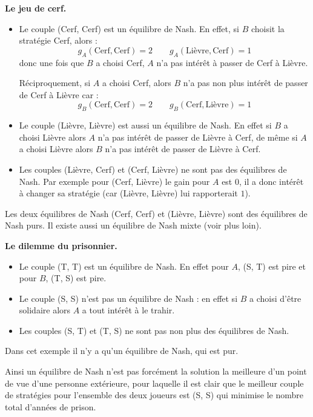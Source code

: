 \documentclass[11pt,class=report,crop=false]{standalone}
\begin{document}
\textbf{Le jeu de cerf.}




\begin{itemize}
	\item Le couple (Cerf, Cerf) est un équilibre de Nash.
	En effet, si $B$ choisit la stratégie Cerf, alors :
	$$g_A(\text{Cerf}, \text{Cerf}) = 2 \qquad g_A(\text{Lièvre}, \text{Cerf}) = 1$$
	donc une fois que $B$ a choisi Cerf, $A$ n'a pas intérêt à passer de Cerf à Lièvre.
	
	Réciproquement, si $A$ a choisi Cerf, alors $B$ n'a pas non plus intérêt de passer de Cerf à Lièvre car :
	$$g_B(\text{Cerf}, \text{Cerf}) = 2 \qquad g_B(\text{Cerf}, \text{Lièvre}) = 1$$	
	
	
	\item Le couple (Lièvre, Lièvre) est aussi un équilibre de Nash. En effet si $B$ a choisi Lièvre alors $A$ n'a pas intérêt de passer de Lièvre à Cerf, de même si $A$ a choisi Lièvre alors $B$ n'a pas intérêt de passer de Lièvre à Cerf.
	
    \item Les couples (Lièvre, Cerf) et (Cerf, Lièvre) ne sont pas des équilibres de Nash. Par exemple pour (Cerf, Lièvre) le gain pour $A$ est $0$, il a donc intérêt à changer sa stratégie (car (Lièvre, Lièvre) lui rapporterait $1$).
\end{itemize}

Les deux équilibres de Nash (Cerf, Cerf) et  (Lièvre, Lièvre) sont des équilibres de Nash purs. Il existe aussi un équilibre de Nash mixte (voir plus loin).

\bigskip
\textbf{Le dilemme du prisonnier.}



\begin{itemize}
	\item Le couple (T, T) est un équilibre de Nash. En effet pour $A$, (S, T) est pire et pour $B$, (T, S) est pire.
	\item Le couple (S, S) n'est pas un équilibre de Nash : en effet si $B$ a choisi d'être solidaire alors $A$ a tout intérêt à le trahir.
	\item Les couples (S, T) et (T, S) ne sont pas non plus des équilibres de Nash.
\end{itemize}

Dans cet exemple il n'y a qu'un équilibre de Nash, qui est pur.

Ainsi un équilibre de Nash n'est pas forcément la solution la meilleure d'un point de vue d'une personne extérieure, pour laquelle il est clair que le meilleur couple de stratégies pour l'ensemble des deux joueurs est (S, S) qui minimise le nombre total d'années de prison.
\end{document}
